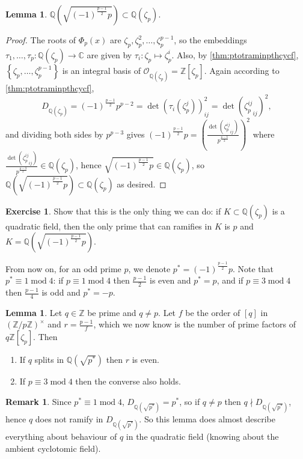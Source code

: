 \documentclass{article}
\newcommand{\Z}{\mathbb{Z}}
\newcommand{\Q}{\mathbb{Q}}
\newcommand{\C}{\mathbb{C}}
\newcommand{\Mod}{\operatorname{mod}}
\newcommand{\ri}{\mathcal{O}}
\theoremstyle{definition}
\newtheorem{lemma}[defn]{Lemma}
\newtheorem{exe}[defn]{Exercise}
\newtheorem{remark}[defn]{Remark}
\begin{document}
\begin{lemma}
$\Q\left(\sqrt{(-1)^{\frac{p-1}{2}}p}\right)\subset\Q(\zeta_p)$.
\end{lemma}
\begin{proof}
The roots of $\Phi_p(x)$ are $\zeta_p,\zeta_p^2,\ldots,\zeta_p^{p-1}$, so the embeddings $\tau_1,\ldots,\tau_p:\Q(\zeta_p)\rightarrow\C$ are given by $\tau_i:\zeta_p\mapsto \zeta_p^i$. Also, by \ref{thm:ptotraminpthcycf}, $\left\{\zeta_p,\ldots,\zeta_p^{p-1}\right\}$ is an integral basis of $\ri_{\Q(\zeta_p)}=\Z[\zeta_p]$. Again according to \ref{thm:ptotraminpthcycf},
\[
D_{\Q(\zeta_p)}=(-1)^{\frac{p-1}{2}}p^{p-2}=\det (\tau_i(\zeta_p^j))_{ij}^2=\det \left({\zeta_p^{ij}}_{ij}\right)^2,
\]
and dividing both sides by $p^{p-3}$ gives $(-1)^{\frac{p-1}{2}}p=\left(\frac{\det \left({\zeta_p^{ij}}_{ij}\right)}{p^{\frac{p-3}{2}}}\right)^2$ where $\frac{\det \left({\zeta_p^{ij}}_{ij}\right)}{p^{\frac{p-3}{2}}}\in\Q(\zeta_p)$, hence $\sqrt{(-1)^{\frac{p-1}{2}}p}\in\Q(\zeta_p)$, so $\Q\left(\sqrt{(-1)^{\frac{p-1}{2}}p}\right)\subset\Q(\zeta_p)$ as desired.
\end{proof}

\begin{exe}
Show that this is the only thing we can do: if $K\subset\Q(\zeta_p)$ is a quadratic field, then the only prime that can ramifies in $K$ is $p$ and $K=\Q\left(\sqrt{(-1)^{\frac{p-1}{2}}p}\right)$.
\end{exe}
From now on, for an odd prime $p$, we denote $p^\ast=(-1)^{\frac{p-1}{2}}p$. Note that $p^\ast\equiv 1\Mod 4$: if $p\equiv 1\Mod 4$ then $\frac{p-1}{2}$ is even and $p^\ast=p$, and if $p\equiv 3\Mod 4$ then $\frac{p-1}{4}$ is odd and $p^\ast=-p$.

\begin{lemma}
\label{lemma:qsplitsthenriseven}
Let $q\in\Z$ be prime and $q\neq p$. Let $f$ be the order of $[q]$ in $(\Z/p\Z)^\times$ and $r=\frac{p-1}{f}$, which we now know is the number of prime factors of $q\Z[\zeta_p]$. Then
\begin{enumerate}
\item If $q$ splits in $\Q\left(\sqrt{p^\ast}\right)$ then $r$ is even.
\item If $p\equiv 3\Mod 4$ then the converse also holds.
\end{enumerate}
\end{lemma}

\begin{remark}
Since $p^\ast\equiv 1\Mod 4$, $D_{\Q\left(\sqrt{p^\ast}\right)}=p^\ast$, so if $q\neq p$ then $q\nmid D_{\Q\left(\sqrt{p^\ast}\right)}$, hence $q$ does not ramify in $D_{\Q\left(\sqrt{p^\ast}\right)}$. So this lemma does almost describe everything about behaviour of $q$ in the quadratic field (knowing about the ambient cyclotomic field).
\end{remark}
\end{document}
